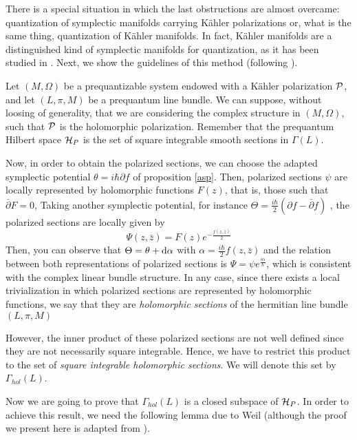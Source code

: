 \documentclass[12pt]{article}
\def\dst{\(}
\def\d{{\rm d}}
\def\P{{\cal P}}
\def\H{{\cal H}}
\begin{document}
There is a special situation in which  the last obstructions are almost
overcame:
quantization of symplectic manifolds carrying K\"ahler polarizations
or, what is the same thing, quantization of K\"ahler manifolds.
In fact, K\"ahler manifolds are a distinguished kind of symplectic
manifolds
for quantization, as it has been studied in \cite{GS-gqmgr}.
Next, we show the guidelines of this method
(following \cite{Wo-80}).

Let $(M,\Omega )$ be a prequantizable system
endowed with a K\"ahler polarization $\P$,
and let $(L,\pi ,M)$ be a prequantum line bundle.
We can suppose, without loosing of generality, that
we are considering the complex structure in $(M,\Omega )$,
such that $\P$ is the holomorphic polarization.
Remember that the prequantum Hilbert space $\H_P$
is the set of square integrable smooth sections
in $\Gamma (L)$.

Now, in order to obtain the polarized sections,
we can choose the adapted symplectic potential
$\theta = i\hbar \partial f$ of proposition \ref{asp}.
Then, polarized sections $\psi$  are locally represented by holomorphic
functions
$F(z)$, that is, those such that $\bar \partial F = 0$,
Taking another symplectic potential, for instance
\dst\Theta = \frac{i\hbar}{2}(\partial f -\bar \partial f)\) ,
the polarized sections are locally given by
$$
\Psi (z,\bar z) = F(z) e^{-\frac{f(z,\bar z)}{2}}
$$
Then, you can observe that
$\Theta = \theta + \d \alpha$ with
\dst\alpha = \frac{i\hbar}{2}f(z,\bar z)\)
and the relation between both representations of polarized sections is
$\Psi = \psi e^{\frac{i\alpha}{\hbar}}$,
which is consistent with the complex linear bundle structure.
In any case, since there exists a local trivialization
in which polarized sections are represented by holomorphic functions,
we say that they are
{\it holomorphic sections} of the hermitian line bundle
$(L,\pi ,M)$

However, the inner product of these polarized sections
are not well defined since they are not necessarily
square integrable. Hence, we have to restrict this product to the set
of {\it square integrable holomorphic sections}.
We will denote this set by
$\Gamma_{hol}(L)$.

Now we are going to prove that
$\Gamma_{hol}(L)$ is a closed subspace of $\H_P$.
In order to achieve this result,
we need the following lemma due to Weil \cite{We-58}
(although the proof we present here is adapted from
\cite{Tu-gbkgq}).
\end{document}

